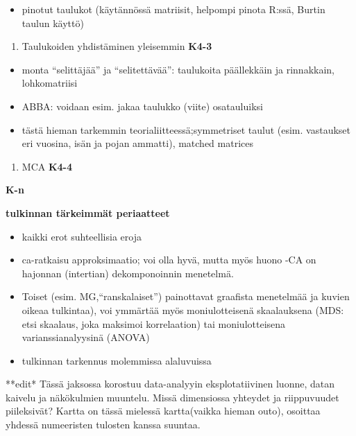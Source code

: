 \documentclass[
  finnish,
]{book}
\providecommand{\tightlist}{%
  \setlength{\itemsep}{0pt}\setlength{\parskip}{0pt}}
\begin{document}
\begin{itemize}
\tightlist
\item
  pinotut taulukot (käytännössä matriisit, helpompi pinota R:ssä, Burtin taulun käyttö)
\end{itemize}

\begin{enumerate}
\def\labelenumi{\arabic{enumi}.}
\setcounter{enumi}{2}
\tightlist
\item
  Taulukoiden yhdistäminen yleisemmin \textbf{K4-3}
\end{enumerate}

\begin{itemize}
\tightlist
\item
  monta ``selittäjää'' ja ``selitettävää'': taulukoita päällekkäin ja rinnakkain, lohkomatriisi
\item
  ABBA: voidaan esim. jakaa taulukko (viite) osatauluiksi
\item
  tästä hieman tarkemmin teorialiitteessä;symmetriset taulut (esim. vastaukset
  eri vuosina, isän ja pojan ammatti), matched matrices
\end{itemize}

\begin{enumerate}
\def\labelenumi{\arabic{enumi}.}
\setcounter{enumi}{3}
\tightlist
\item
  MCA \textbf{K4-4}
\end{enumerate}

\textbf{K-n}

\textbf{tulkinnan tärkeimmät periaatteet}

\begin{itemize}
\tightlist
\item
  kaikki erot suhteellisia eroja
\item
  ca-ratkaisu approksimaatio; voi olla hyvä, mutta myös huono
  -CA on hajonnan (intertian) dekomponoinnin menetelmä.
\item
  Toiset (esim. MG,``ranskalaiset'') painottavat graafista menetelmää ja kuvien oikeaa tulkintaa),
  voi ymmärtää myös moniulotteisenä skaalauksena (MDS: etsi skaalaus, joka maksimoi
  korrelaation) tai moniulotteisena varianssianalyysinä (ANOVA)
\item
  tulkinnan tarkennus molemmissa alaluvuissa
\end{itemize}

**edit* Tässä jaksossa korostuu data-analyyin eksplotatiivinen luonne, datan kaivelu
ja näkökulmien muuntelu. Missä dimensiossa yhteydet ja riippuvuudet piileksivät?
Kartta on tässä mielessä kartta(vaikka hieman outo), osoittaa yhdessä numeeristen
tulosten kanssa suuntaa.
\end{document}

